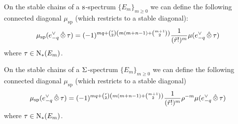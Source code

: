 \begin{corollary}
 On the stable chains of a $\operatorname{s}^{}$-spectrum $\{E_m\}_{m \geq 0}$ we can define the following connected diagonal $\mu_{\mathrm{sp}}$ (which restricts to a stable diagonal):
 \[
 \mu_{\mathrm{sp}}(e_{-q}^\vee \operatorname{\hat{\otimes}} \tau) = (-1)^{mq+\binom{r}{2}\left(m(m+n-1) + \binom{m+1}{2}\right)} \frac{1}{(\tilde{r}!)^m}\mu(e_{-q}^\vee \operatorname{\hat{\otimes}} \tau)
 \]
 where $\tau\in\operatorname{N}_{*}(E_m)$.
\end{corollary}

\begin{corollary}
 On the stable chains of a $\Sigma^{}$-spectrum $\{E_m\}_{m \geq 0}$ we can define the following connected diagonal $\mu_{\mathrm{sp}}$ (which restricts to a stable diagonal)
 \[
 \mu_{\mathrm{sp}}(e_{-q}^\vee \operatorname{\hat{\otimes}} \tau) = (-1)^{mq+\binom{r}{2}\left(m(m+n-1) + \binom{m+1}{2}\right)}\frac{1}{(\tilde{r}!)^{m}}\rho^{-m} \mu(e_{-q}^\vee \operatorname{\hat{\otimes}} \tau)
 \]
 where $\tau\in \operatorname{N}_{*}(E_m)$.
\end{corollary}



